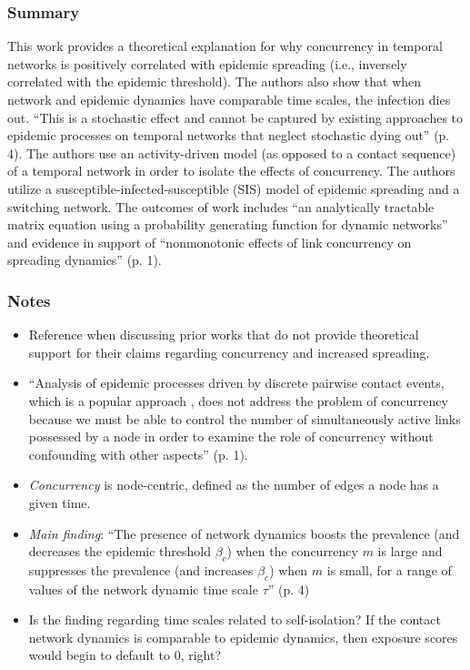\subsubsection*{Summary}
This work provides a theoretical explanation for why concurrency in temporal networks is positively correlated with epidemic spreading (i.e., inversely correlated with the epidemic threshold). The authors also show that when network and epidemic dynamics have comparable time scales, the infection dies out. ``This is a stochastic effect and cannot be captured by existing approaches to epidemic processes on temporal networks that neglect stochastic dying out'' (p. 4). The authors use an activity-driven model (as opposed to a contact sequence) of a temporal network in order to isolate the effects of concurrency. The authors utilize a susceptible-infected-susceptible (SIS) model of epidemic spreading and a switching network. The outcomes of  work includes ``an analytically tractable matrix equation using a probability generating function for dynamic networks'' and evidence in support of ``nonmonotonic effects of link concurrency on spreading dynamics'' (p. 1).
\subsubsection*{Notes}
\begin{itemize}
\item Reference when discussing prior works that do not provide theoretical support for their claims regarding concurrency and increased spreading.
\item ``Analysis of epidemic processes driven by discrete pairwise contact events, which is a popular approach \cite{Holme2012,Holme2015b,Masuda2013,Karsai2011,Stehle2011a}, does not address the problem of concurrency because we must be able to control the number of simultaneously active links possessed by a node in order to examine the role of concurrency without confounding with other aspects'' (p. 1).
\item \emph{Concurrency} is node-centric, defined as the number of edges a node has a given time.
\item \emph{Main finding}: ``The presence of network dynamics boosts the prevalence (and decreases the epidemic threshold $\beta_c$) when the concurrency $m$ is large and suppresses the prevalence (and increases $\beta_c$) when $m$ is small, for a range of values of the network dynamic time scale $\tau$'' (p. 4)
\item Is the finding regarding time scales related to self-isolation? If the contact network dynamics is comparable to epidemic dynamics, then exposure scores would begin to default to 0, right?
\end{itemize}


